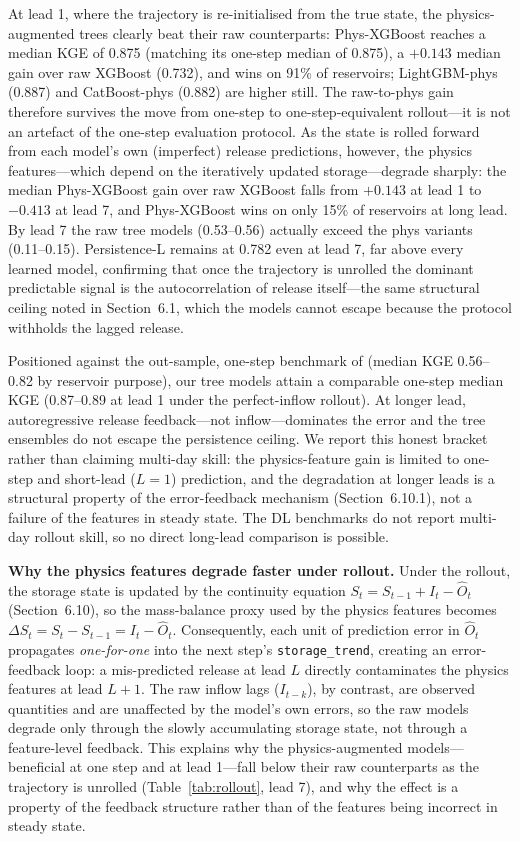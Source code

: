\documentclass[journal]{ascelike-new}
\begin{document}
At lead 1, where the trajectory is re-initialised from the true state, the physics-augmented trees clearly beat their raw counterparts: Phys-XGBoost reaches a median KGE of 0.875 (matching its one-step median of 0.875), a $+0.143$ median gain over raw XGBoost (0.732), and wins on 91\% of reservoirs; LightGBM-phys (0.887) and CatBoost-phys (0.882) are higher still. The raw-to-phys gain therefore survives the move from one-step to one-step-equivalent rollout---it is not an artefact of the one-step evaluation protocol. As the state is rolled forward from each model's own (imperfect) release predictions, however, the physics features---which depend on the iteratively updated storage---degrade sharply: the median Phys-XGBoost gain over raw XGBoost falls from $+0.143$ at lead 1 to $-0.413$ at lead 7, and Phys-XGBoost wins on only 15\% of reservoirs at long lead. By lead 7 the raw tree models (0.53--0.56) actually exceed the phys variants (0.11--0.15). Persistence-L remains at 0.782 even at lead 7, far above every learned model, confirming that once the trajectory is unrolled the dominant predictable signal is the autocorrelation of release itself---the same structural ceiling noted in Section~6.1, which the models cannot escape because the protocol withholds the lagged release.

Positioned against the out-sample, one-step benchmark of \citet{Tran2025} (median KGE 0.56--0.82 by reservoir purpose), our tree models attain a comparable one-step median KGE (0.87--0.89 at lead 1 under the perfect-inflow rollout). At longer lead, autoregressive release feedback---not inflow---dominates the error and the tree ensembles do not escape the persistence ceiling. We report this honest bracket rather than claiming multi-day skill: the physics-feature gain is limited to one-step and short-lead ($L{=}1$) prediction, and the degradation at longer leads is a structural property of the error-feedback mechanism (Section~6.10.1), not a failure of the features in steady state. The DL benchmarks do not report multi-day rollout skill, so no direct long-lead comparison is possible.

\textbf{Why the physics features degrade faster under rollout.} Under the rollout, the storage state is updated by the continuity equation $S_t = S_{t-1} + I_t - \hat O_t$ (Section~6.10), so the mass-balance proxy used by the physics features becomes $\Delta S_t = S_t - S_{t-1} = I_t - \hat O_t$. Consequently, each unit of prediction error in $\hat O_t$ propagates \emph{one-for-one} into the next step's \texttt{storage\_trend}, creating an error-feedback loop: a mis-predicted release at lead $L$ directly contaminates the physics features at lead $L+1$. The raw inflow lags ($I_{t-k}$), by contrast, are observed quantities and are unaffected by the model's own errors, so the raw models degrade only through the slowly accumulating storage state, not through a feature-level feedback. This explains why the physics-augmented models---beneficial at one step and at lead 1---fall below their raw counterparts as the trajectory is unrolled (Table~\ref{tab:rollout}, lead 7), and why the effect is a property of the feedback structure rather than of the features being incorrect in steady state.
\end{document}
